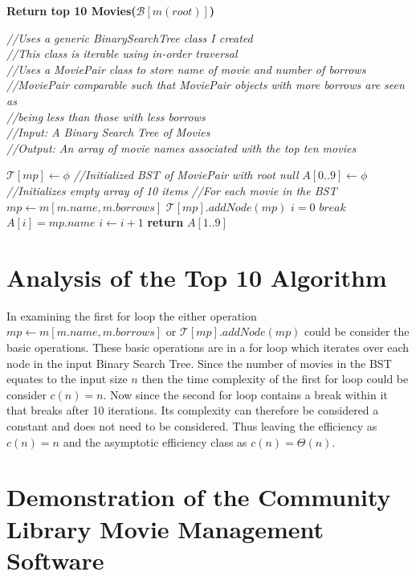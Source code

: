 \documentclass[a4paper,12pt]{article}
\begin{document}
\begin{algorithm}
\caption{\textbf{Return top 10 Movies($ \mathcal B[m(root)]$)}}
\emph{//Uses a generic BinarySearchTree class I created}\\
\emph{//This class is iterable using in-order traversal}\\
\emph{//Uses a MoviePair class to store name of movie and number of borrows}\\
\emph{//MoviePair comparable such that MoviePair objects with more borrows are seen as}\\
\emph{//being less than those with less borrows}\\
\emph{//Input: A Binary Search Tree of Movies}\\
\emph{//Output: An array of movie names associated with the top ten movies}
\begin{algorithmic}[1]
\State $\mathcal T[mp] \leftarrow \phi$ \emph{//Initialized BST of MoviePair with root null}
\State $A[0..9] \leftarrow \phi$ \emph{//Initializes empty array of 10 items}
 \emph{//For each movie in the BST}
	\State $mp \leftarrow m[m.name, m.borrows]$ 
	\State $ \mathcal T[mp].addNode(mp)$
\EndFor
\State $i = 0$
		\State $break$
	\EndIf
	\State $A[i] = mp.name$
	\State $i \leftarrow i + 1$
\EndFor
\State \textbf{return} $A[1..9]$
\end{algorithmic}
\end{algorithm}
\section{Analysis of the Top 10 Algorithm}
In examining the first for loop the either operation $mp \leftarrow m[m.name, m.borrows]$ or $ \mathcal T[mp].addNode(mp)$ could be consider the basic operations. These basic operations are in a for loop which iterates over each node in the input Binary Search Tree. Since the number of movies in the BST equates to the input size $n$ then the time complexity of the first for loop could be consider $c(n) = n$. Now since the second for loop contains a break within it that breaks after 10 iterations. Its complexity can therefore be considered a constant and does not need to be considered. Thus leaving the efficiency as $c(n) = n$ and the asymptotic efficiency class as $c(n) = \Theta(n)$.

\newpage

\section{Demonstration of the Community Library Movie Management Software}
\end{document}
